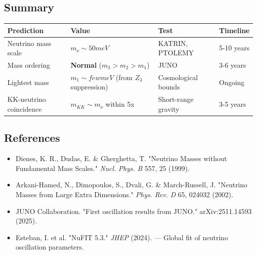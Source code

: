 \documentclass[aps,prd,preprint,superscriptaddress,longbibliography,floatfix]{revtex4-2}
\theoremstyle{remark}
\begin{document}
\subsection{Summary}


\begin{table}[H]
\begin{ruledtabular}
\begin{tabular}{p{3.8cm}p{3.8cm}p{3.8cm}p{3.8cm}}
Prediction & Value & Test & Timeline \\
\hline
Neutrino mass scale & $m_\nu \sim  50 meV$ & KATRIN, PTOLEMY & 5-10 years \\
Mass ordering & \textbf{Normal} ($m_{3} > m_{2} > m_{1}$) & JUNO & 3-6 years \\
Lightest mass & $m_{1} \sim  few meV$ (from $Z_{3}$ suppression) & Cosmological bounds & Ongoing \\
KK-neutrino coincidence & $m_{KK} \sim  m_\nu$ within 5x & Short-range gravity & 3-5 years \\
\end{tabular}
\end{ruledtabular}
\end{table}


\subsection{References}


\begin{itemize}
  \item Dienes, K. R., Dudas, E. \& Gherghetta, T. "Neutrino Masses without Fundamental Mass Scales." \textit{Nucl. Phys. B} 557, 25 (1999).
  \item Arkani-Hamed, N., Dimopoulos, S., Dvali, G. \& March-Russell, J. "Neutrino Masses from Large Extra Dimensions." \textit{Phys. Rev. D} 65, 024032 (2002).
  \item JUNO Collaboration. "First oscillation results from JUNO." arXiv:2511.14593 (2025).
  \item Esteban, I. et al. "NuFIT 5.3." \textit{JHEP} (2024). --- Global fit of neutrino oscillation parameters.
\end{itemize}



\end{document}
